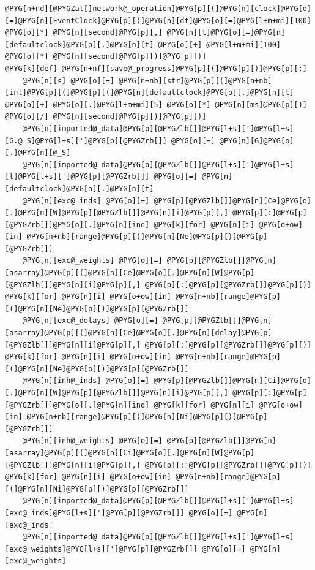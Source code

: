 \documentclass[letterpaper,10pt,english]{manual}
\begin{document}
\begin{Verbatim}[commandchars=@\[\]]
@PYG[n+nd][@PYGZat[]network@_operation]@PYG[p][(]@PYG[n][clock]@PYG[o][=]@PYG[n][EventClock]@PYG[p][(]@PYG[n][dt]@PYG[o][=]@PYG[l+m+mi][100] @PYG[o][*] @PYG[n][second]@PYG[p][,] @PYG[n][t]@PYG[o][=]@PYG[n][defaultclock]@PYG[o][.]@PYG[n][t] @PYG[o][+] @PYG[l+m+mi][100] @PYG[o][*] @PYG[n][second]@PYG[p][)]@PYG[p][)]
@PYG[k][def] @PYG[n+nf][save@_progress]@PYG[p][(]@PYG[p][)]@PYG[p][:]
    @PYG[n][s] @PYG[o][=] @PYG[n+nb][str]@PYG[p][(]@PYG[n+nb][int]@PYG[p][(]@PYG[p][(]@PYG[n][defaultclock]@PYG[o][.]@PYG[n][t] @PYG[o][+] @PYG[o][.]@PYG[l+m+mi][5] @PYG[o][*] @PYG[n][ms]@PYG[p][)] @PYG[o][/] @PYG[n][second]@PYG[p][)]@PYG[p][)]
    @PYG[n][imported@_data]@PYG[p][@PYGZlb[]]@PYG[l+s][']@PYG[l+s][G.@_S]@PYG[l+s][']@PYG[p][@PYGZrb[]] @PYG[o][=] @PYG[n][G]@PYG[o][.]@PYG[n][@_S]
    @PYG[n][imported@_data]@PYG[p][@PYGZlb[]]@PYG[l+s][']@PYG[l+s][t]@PYG[l+s][']@PYG[p][@PYGZrb[]] @PYG[o][=] @PYG[n][defaultclock]@PYG[o][.]@PYG[n][t]
    @PYG[n][exc@_inds] @PYG[o][=] @PYG[p][@PYGZlb[]]@PYG[n][Ce]@PYG[o][.]@PYG[n][W]@PYG[p][@PYGZlb[]]@PYG[n][i]@PYG[p][,] @PYG[p][:]@PYG[p][@PYGZrb[]]@PYG[o][.]@PYG[n][ind] @PYG[k][for] @PYG[n][i] @PYG[o+ow][in] @PYG[n+nb][range]@PYG[p][(]@PYG[n][Ne]@PYG[p][)]@PYG[p][@PYGZrb[]]
    @PYG[n][exc@_weights] @PYG[o][=] @PYG[p][@PYGZlb[]]@PYG[n][asarray]@PYG[p][(]@PYG[n][Ce]@PYG[o][.]@PYG[n][W]@PYG[p][@PYGZlb[]]@PYG[n][i]@PYG[p][,] @PYG[p][:]@PYG[p][@PYGZrb[]]@PYG[p][)] @PYG[k][for] @PYG[n][i] @PYG[o+ow][in] @PYG[n+nb][range]@PYG[p][(]@PYG[n][Ne]@PYG[p][)]@PYG[p][@PYGZrb[]]
    @PYG[n][exc@_delays] @PYG[o][=] @PYG[p][@PYGZlb[]]@PYG[n][asarray]@PYG[p][(]@PYG[n][Ce]@PYG[o][.]@PYG[n][delay]@PYG[p][@PYGZlb[]]@PYG[n][i]@PYG[p][,] @PYG[p][:]@PYG[p][@PYGZrb[]]@PYG[p][)] @PYG[k][for] @PYG[n][i] @PYG[o+ow][in] @PYG[n+nb][range]@PYG[p][(]@PYG[n][Ne]@PYG[p][)]@PYG[p][@PYGZrb[]]
    @PYG[n][inh@_inds] @PYG[o][=] @PYG[p][@PYGZlb[]]@PYG[n][Ci]@PYG[o][.]@PYG[n][W]@PYG[p][@PYGZlb[]]@PYG[n][i]@PYG[p][,] @PYG[p][:]@PYG[p][@PYGZrb[]]@PYG[o][.]@PYG[n][ind] @PYG[k][for] @PYG[n][i] @PYG[o+ow][in] @PYG[n+nb][range]@PYG[p][(]@PYG[n][Ni]@PYG[p][)]@PYG[p][@PYGZrb[]]
    @PYG[n][inh@_weights] @PYG[o][=] @PYG[p][@PYGZlb[]]@PYG[n][asarray]@PYG[p][(]@PYG[n][Ci]@PYG[o][.]@PYG[n][W]@PYG[p][@PYGZlb[]]@PYG[n][i]@PYG[p][,] @PYG[p][:]@PYG[p][@PYGZrb[]]@PYG[p][)] @PYG[k][for] @PYG[n][i] @PYG[o+ow][in] @PYG[n+nb][range]@PYG[p][(]@PYG[n][Ni]@PYG[p][)]@PYG[p][@PYGZrb[]]
    @PYG[n][imported@_data]@PYG[p][@PYGZlb[]]@PYG[l+s][']@PYG[l+s][exc@_inds]@PYG[l+s][']@PYG[p][@PYGZrb[]] @PYG[o][=] @PYG[n][exc@_inds]
    @PYG[n][imported@_data]@PYG[p][@PYGZlb[]]@PYG[l+s][']@PYG[l+s][exc@_weights]@PYG[l+s][']@PYG[p][@PYGZrb[]] @PYG[o][=] @PYG[n][exc@_weights]

\end{Verbatim}
\end{document}
